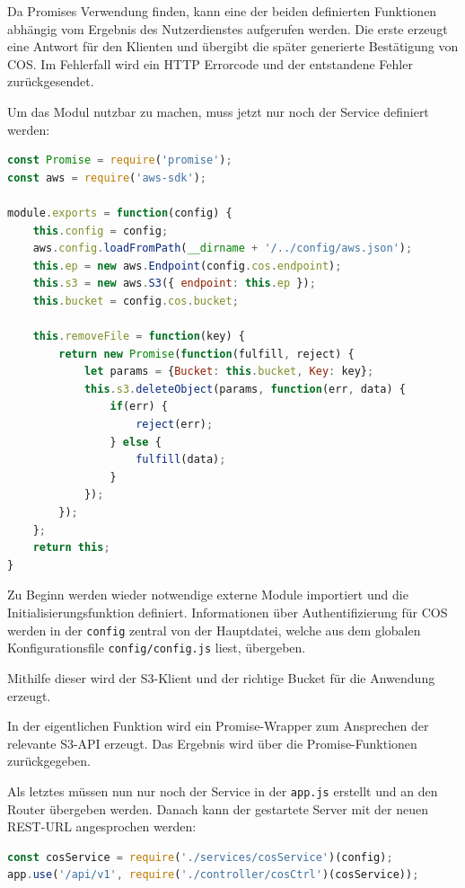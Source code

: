 Da \gls{Promise}s Verwendung finden, kann eine der beiden definierten Funktionen abhängig vom Ergebnis des Nutzerdienstes aufgerufen werden. Die erste erzeugt eine Antwort für den Klienten und übergibt die später generierte Bestätigung von \ac{COS}. Im Fehlerfall wird ein HTTP Errorcode und der entstandene Fehler zurückgesendet.

Um das Modul nutzbar zu machen, muss jetzt nur noch der Service definiert werden:\\

\begin{lstlisting}[language=JavaScript, caption=CosService.js für die Kommunikation mit IBM COS]
const Promise = require('promise');
const aws = require('aws-sdk');

module.exports = function(config) {
	this.config = config;
	aws.config.loadFromPath(__dirname + '/../config/aws.json');
	this.ep = new aws.Endpoint(config.cos.endpoint);
	this.s3 = new aws.S3({ endpoint: this.ep });
	this.bucket = config.cos.bucket;
	
	this.removeFile = function(key) {
		return new Promise(function(fulfill, reject) {
			let params = {Bucket: this.bucket, Key: key};
			this.s3.deleteObject(params, function(err, data) {
				if(err) {
					reject(err);
				} else {
					fulfill(data);
				}
			});
		});
	};
	return this;
}
\end{lstlisting}

Zu Beginn werden wieder notwendige externe Module importiert und die Initialisierungsfunktion definiert. Informationen über Authentifizierung für \ac{COS} werden in der \lstinline|config| zentral von der Hauptdatei, welche aus dem globalen Konfigurationsfile \lstinline|config/config.js| liest, übergeben.

Mithilfe dieser wird der \ac{S3}-Klient und der richtige Bucket für die Anwendung erzeugt. 

In der eigentlichen Funktion wird ein Promise-Wrapper zum Ansprechen der relevante S3-API erzeugt. Das Ergebnis wird über die Promise-Funktionen zurückgegeben.

Als letztes müssen nun nur noch der Service in der \lstinline|app.js| erstellt und an den Router übergeben werden. Danach kann der gestartete Server mit der neuen REST-URL angesprochen werden:\\

\begin{lstlisting}[language=JavaScript, caption=Einbindung der neuen Route in der app.js]
const cosService = require('./services/cosService')(config);
app.use('/api/v1', require('./controller/cosCtrl')(cosService));
\end{lstlisting}


